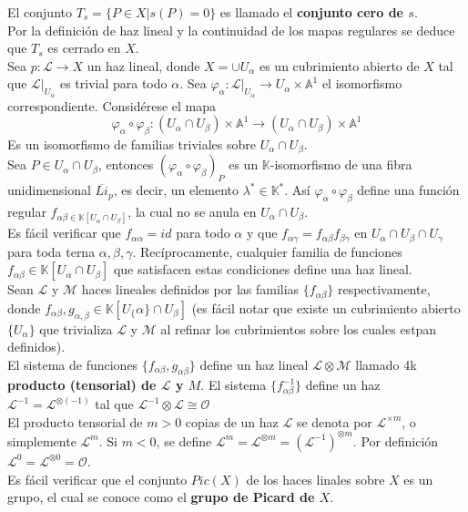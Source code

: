 \documentclass[12pt,a4paper]{report}
\newcommand{\K}{\mathbb{K}}
\newcommand{\Li}{\mathscr{L}}
\newcommand{\M}{\mathscr{M}}
\begin{document}
El conjunto $T_{s}= \{ P \in X | s (P) = 0 \}$ es llamado el \textbf{conjunto cero de $s$}. \\
Por la definición de haz lineal y la continuidad de los mapas regulares se deduce que $T_{{s}}$ es cerrado en $X$.\\

Sea $p:\Li \rightarrow X$ un haz lineal, donde $X=\cup U_{\alpha}$ es un cubrimiento abierto de $X$ tal que $\Li |_{U_{\alpha}} $ es trivial para todo $\alpha$. Sea $\varphi_{\alpha} : \Li |_{U_{\alpha}} \rightarrow U_{\alpha}  \times \mathbb{A}^{1} $ el isomorfismo correspondiente. Considérese el mapa
$$ \varphi_{\alpha} \circ \varphi_{\beta} : (U_{\alpha}\cap U_{\beta}) \times \mathbb{A}^{1} \rightarrow (U_{\alpha}\cap U_{\beta}) \times \mathbb{A}^{1} $$
Es un isomorfismo de familias triviales sobre $U_{\alpha} \cap U_{\beta}$. \\
Sea $P \in U_{\alpha} \cap U_{\beta}$, entonces $(\varphi_{\alpha} \circ \varphi_{\beta})_{P}$ es un $\K$-isomorfismo de una fibra unidimensional $\overline{Li}_{p}$, es decir, un elemento $\lambda^{*} \in \K^{*}$. Así $\varphi_{\alpha} \circ \varphi_{\beta}$ define una función regular $f_{\alpha \beta \in \K [U_{\alpha}\cap U_{\beta}]}$, la cual no se anula en $U_{\alpha}\cap U_{\beta}$. \\
Es fácil verificar que $f_{\alpha \alpha} =id $ para todo $\alpha$ y que $f_{\alpha \gamma}= f_{\alpha \beta} f _{\beta \gamma}$ en $ U_{\alpha}\cap U_{\beta} \cap U_{\gamma} $ para toda terna $\alpha, \beta, \gamma$. Recíprocamente, cualquier familia de funciones $f_{\alpha \beta} \in \K[U_{\alpha}\cap U_{\beta}] $ que satisfacen estas condiciones define una haz lineal.\\

Sean $\Li$ y $\M$ haces lineales definidos por las familias $\{ f_{\alpha \beta} \}$ respectivamente, donde $f_{\alpha\beta}, g_{\alpha,\beta} \in \K [U_\{\alpha \} \cap U_{\beta} ]$ (es fácil notar que existe un cubrimiento abierto $\{ U_{\alpha} \}$ que trivializa $\Li$ y $\M$ al refinar los cubrimientos sobre los cuales estpan definidos). \\
El sistema de funciones $\{f_{\alpha \beta}, g_{\alpha \beta} \}$ define un haz lineal $\Li \otimes \M$ llamado 4k \textbf{producto (tensorial) de $\Li$ y $M$}. El sistema $\{f^{-1}_{\alpha \beta}\}$ define un haz $ \Li^{-1}= \Li ^{\otimes (-1)} $ tal que $ \Li^{-1} \otimes \Li \cong \mathscr{O}$\\
El producto tensorial de $m>0$ copias de un haz $\Li$ se denota por $\Li^{\times m} $, o simplemente $\Li^{m}$. Si $m<0$, se define $ \Li^{m} =\Li^{\otimes m} = (\Li ^{-1})^{\otimes m} $. Por definición $\Li^{0} = \Li^{\otimes 0} = \mathscr{O}$.\\
Es fácil verificar que el conjunto $Pic(X)$ de los haces linales sobre $X$ es un grupo, el cual se conoce como el \textbf{grupo de Picard de $X$}.\\
\end{document}
